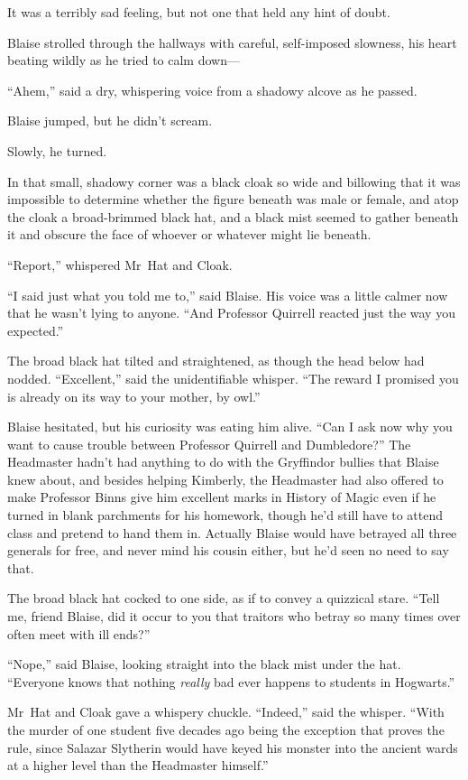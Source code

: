 It was a terribly sad feeling, but not one that held any hint of doubt.

Blaise strolled through the hallways with careful, self-imposed slowness, his
heart beating wildly as he tried to calm down—

“Ahem,” said a dry, whispering voice from a shadowy alcove as he passed.

Blaise jumped, but he didn’t scream.

Slowly, he turned.

In that small, shadowy corner was a black cloak so wide and billowing that it
was impossible to determine whether the figure beneath was male or female, and
atop the cloak a broad-brimmed black hat, and a black mist seemed to gather
beneath it and obscure the face of whoever or whatever might lie beneath.

“Report,” whispered Mr~Hat and Cloak.

“I said just what you told me to,” said Blaise. His voice was a little calmer
now that he wasn’t lying to anyone. “And Professor Quirrell reacted just the
way you expected.”

The broad black hat tilted and straightened, as though the head below had
nodded. “Excellent,” said the unidentifiable whisper. “The reward I promised
you is already on its way to your mother, by owl.”

Blaise hesitated, but his curiosity was eating him alive. “Can I ask now why
you want to cause trouble between Professor Quirrell and Dumbledore?” The
Headmaster hadn’t had anything to do with the Gryffindor bullies that Blaise
knew about, and besides helping Kimberly, the Headmaster had also offered to
make Professor Binns give him excellent marks in History of Magic even if he
turned in blank parchments for his homework, though he’d still have to attend
class and pretend to hand them in. Actually Blaise would have betrayed all
three generals for free, and never mind his cousin either, but he’d seen no
need to say that.

The broad black hat cocked to one side, as if to convey a quizzical stare.
“Tell me, friend Blaise, did it occur to you that traitors who betray so many
times over often meet with ill ends?”

“Nope,” said Blaise, looking straight into the black mist under the hat.
“Everyone knows that nothing \emph{really} bad ever happens to students in
Hogwarts.”

Mr~Hat and Cloak gave a whispery chuckle. “Indeed,” said the whisper. “With
the murder of one student five decades ago being the exception that proves the
rule, since Salazar Slytherin would have keyed his monster into the ancient
wards at a higher level than the Headmaster himself.”

